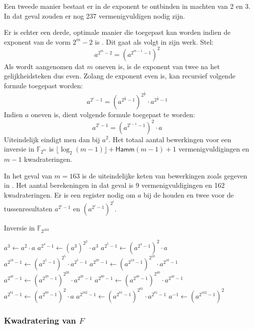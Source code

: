 Een tweede manier bestaat er in de exponent te ontbinden in machten van 2 en 3. In dat geval zouden er nog 237 vermenigvuldigen nodig zijn.

Er is echter een derde, optimale manier die toegepast kan worden indien de exponent van de vorm $2^m - 2$ is \cite{batina-pkc, itoh}. Dit gaat als volgt in zijn werk. Stel:
\[a^{2^m - 2} = (a^{2^{m - 1} - 1})^2\]
Als wordt aangenomen dat $m$ oneven is, is de exponent van twee na het gelijkheidsteken dus even. Zolang de exponent even is, kan recursief volgende formule toegepast worden:
\[a^{2^i - 1} = (a^{2^{\frac{i}{2}} - 1})^{2^{\frac{i}{2}}} \cdot a^{2^{\frac{i}{2}} - 1}\]
Indien $a$ oneven is, dient volgende formule toegepast te worden:
\[a^{2^i - 1} = (a^{2^{i - 1} - 1})^2 \cdot a\]
Uiteindelijk eindigt men dan bij $a^2$. Het totaal aantal bewerkingen voor een inversie in $\mathbb{F}_{2^m}$ is $\lfloor\log_2(m - 1)\rfloor + \textsf{Hamm}(m - 1) + 1$ vermenigvuldigingen en $m - 1$ kwadrateringen.

In het geval van $m = 163$ is de uiteindelijke keten van bewerkingen zoals gegeven in . Het aantal berekeningen in dat geval is 9 vermenigvuldigingen en 162 kwadrateringen. Er is een register nodig om $a$ bij de houden en twee voor de tussenresultaten $a^{2^i - 1}$ en $(a^{2^i - 1})^{2^i}$.

\begin{algorithm}[h]
	\caption{Inversie in $\mathbb{F}_{2^{163}}$}
	\label{algoritme-implementatie-miller-inversie}
	$a^3 \gets a^2 \cdot a$\;
	$a^{2^4 - 1} \gets (a^3)^{2^2} \cdot a^3$\;
	$a^{2^5 - 1} \gets (a^{2^4 - 1})^2 \cdot a$\;
	$a^{2^{10} - 1} \gets (a^{2^5 - 1})^{2^5} \cdot a^{2^5 - 1}$\;
	$a^{2^{20} - 1} \gets (a^{2^{10} - 1})^{2^{10}} \cdot a^{2^{10} - 1}$\;
	$a^{2^{40} - 1} \gets (a^{2^{20} - 1})^{2^{20}} \cdot a^{2^{20} - 1}$\;
	$a^{2^{80} - 1} \gets (a^{2^{40} - 1})^{2^{40}} \cdot a^{2^{40} - 1}$\;
	$a^{2^{81} - 1} \gets (a^{2^{80} - 1})^2 \cdot a$\;
	$a^{2^{162} - 1} \gets (a^{2^{81} - 1})^{2^{81}} \cdot a^{2^{81} - 1}$\;
	$a^{-1} \gets (a^{2^{162} - 1})^2$\;
\end{algorithm}

\subsubsection{Kwadratering van $F$}

